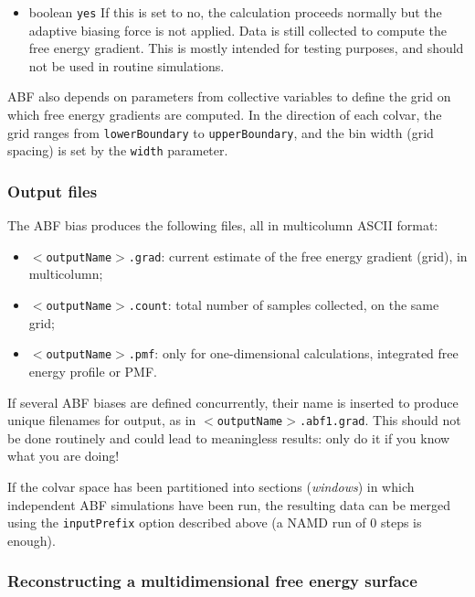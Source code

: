 \begin{itemize}
\item {}
  {boolean}
  {\texttt{yes}}
  { If this is set to no, the calculation proceeds normally but the adaptive
    biasing force is not applied. Data is still collected to compute
    the free energy gradient. This is mostly intended for testing purposes, and should
    not be used in routine simulations.
  }
\end{itemize}

ABF also depends on parameters from collective variables to define the grid on which free
energy gradients are computed. In the direction of each colvar, the grid ranges from
\texttt{lowerBoundary} to \texttt{upperBoundary}, and the bin width (grid spacing)
is set by the \texttt{width} parameter.


\subsubsection*{Output files}

The ABF bias produces the following files, all in multicolumn ASCII format:
\begin{itemize}
\item \texttt{$<$outputName$>$.grad}: current estimate of the free energy gradient (grid),
  in multicolumn;
\item \texttt{$<$outputName$>$.count}: total number of samples collected, on the same grid;
\item \texttt{$<$outputName$>$.pmf}: only for one-dimensional calculations, integrated
  free energy profile or PMF.
\end{itemize}

If several ABF biases are defined concurrently, their name is inserted to produce
unique filenames for output, as in \texttt{$<$outputName$>$.abf1.grad}.
This should not be done routinely and could lead to meaningless results:
only do it if you know what you are doing!

If the colvar space has been partitioned into sections (\emph{windows}) in which independent
ABF simulations have been run, the resulting data can be merged using the
\texttt{inputPrefix} option described above (a NAMD run of 0 steps is enough).

\subsubsection*{Reconstructing a multidimensional free energy surface}

